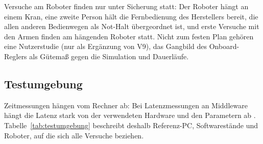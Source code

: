 Versuche am Roboter finden nur unter Sicherung statt: Der Roboter hängt an einem Kran, eine zweite Person hält die Fernbedienung des Herstellers bereit, die allen anderen Bedienwegen als Not-Halt übergeordnet ist, und erste Versuche mit den Armen finden am hängenden Roboter statt.
Nicht zum festen Plan gehören eine Nutzerstudie (nur als Ergänzung von V9), das Gangbild des Onboard-Reglers als Gütemaß gegen die Simulation und Dauerläufe.

\subsection{Testumgebung}
\label{sec:testumgebung}
Zeitmessungen hängen vom Rechner ab: Bei Latenzmessungen an Middleware hängt die Latenz stark von der verwendeten Hardware und den Parametern ab \cite{Kronauer2021}.
Tabelle~\ref{tab:testumgebung} beschreibt deshalb Referenz-PC, Softwarestände und Roboter, auf die sich alle Versuche beziehen.

